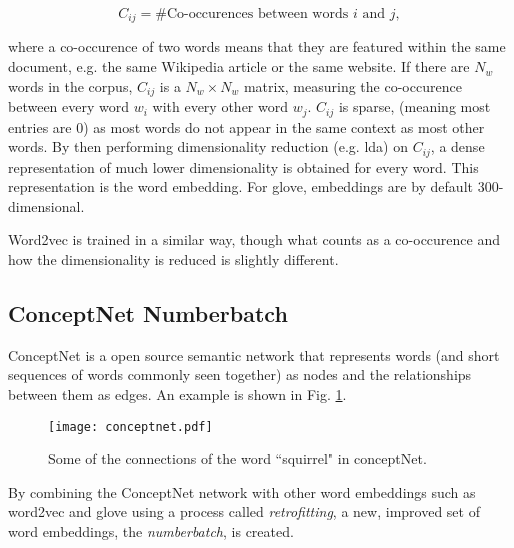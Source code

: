         \begin{equation}
        C_{ij} = \text{\# Co-occurences between words $i$ and $j$},
        \end{equation}
        
        where a co-occurence of two words means that they are featured within the same document, e.g. the same Wikipedia article or the same website. If there are $N_w$ words in the corpus, $C_{ij}$ is a $N_w \times N_w$ matrix, measuring the co-occurence between every word $w_i$ with every other word $w_j$. 
        $C_{ij}$ is sparse, (meaning most entries are 0) as most words do not appear in the same context as most other words. By then performing dimensionality reduction (e.g. \gls{lda}) on $C_{ij}$, a dense representation of much lower dimensionality is obtained for every word. This representation is the word \gls{embedding}. For \gls{glove}, \glspl{embedding} are by default 300-dimensional\cite{glove}.
        
        Word2vec is trained in a similar way, though what counts as a co-occurence and how the dimensionality is reduced is slightly different\cite{word2vec}.
        
    \subsection{ConceptNet Numberbatch \label{ssec: Numberbatch}}
        
        ConceptNet is a open source semantic network that represents words (and short sequences of words commonly seen together) as nodes and the relationships between them as edges. An example is shown in Fig. \ref{fig: conceptnet}.
           \begin{figure}[h]
                \centering
                 \captionsetup{format=hang}
                \texttt{[image: conceptnet.pdf]}
                \caption{Some of the connections of the word ``squirrel" in conceptNet. \label{fig: conceptnet}}
            \end{figure}
        
        By combining the ConceptNet network with other word \glspl{embedding} such as word2vec and \gls{glove} using a process called \textit{retrofitting}, a new, improved set of word \glspl{embedding}, the \textit{\gls{numberbatch}}, is created.
        
